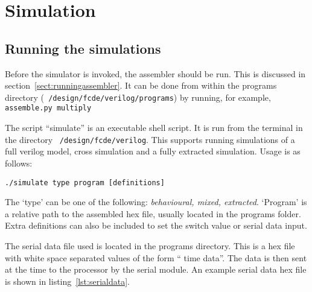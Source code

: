 
\section{Simulation}

\subsection{Running the simulations}

Before the simulator is invoked, the assembler should be run. 
This is discussed in section~\ref{sect:runningassembler}. 
It can be done from within the programs directory (\texttt{~/design/fcde/verilog/programs}) by running, for example, \texttt{assemble.py multiply}

The script ``simulate'' is an executable shell script. 
It is run from the terminal in the directory \texttt{~/design/fcde/verilog}. 
This supports running simulations of a full verilog model, cross simulation and a fully extracted simulation. 
Usage is as follows:\\
\begin{center}
\texttt{./simulate type program [definitions]}
\end{center}

The `type' can be one of the following: \textit{behavioural, mixed, extracted}.
`Program' is a relative path to the assembled hex file, usually located in the programs folder. 
Extra definitions can also be included to set the switch value or serial data input.

The serial data file used is located in the programs directory. 
This is a hex file with white space separated values of the form `` time data''. 
The data is then sent at the time to the processor by the serial module. 
An example serial data hex file is shown in listing~\ref{lst:serialdata}.



